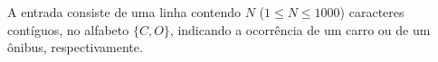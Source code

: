 A entrada consiste de uma linha contendo $N$ ($1 \leq N \leq 1000$) caracteres contíguos, no alfabeto $\{C, O\}$, indicando a ocorrência de um carro ou de um ônibus, respectivamente.

